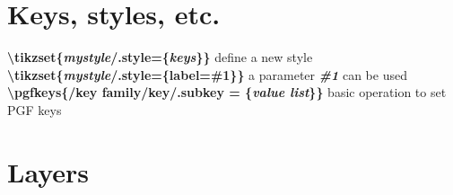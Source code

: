 \documentclass[10pt]{article}
\newcommand{\tikzcmd}[1]{\textbf{#1}}
\newcommand{\tikzparam}[1]{\textbf{\emph{#1}}}
\begin{document}
\begin{multicols}{2}
        \section{Keys, styles, etc.}
        \tikzcmd{\textbackslash tikzset\{\tikzparam{mystyle}/.style=\{\tikzparam{keys}\}\}} define a new style\\
        \tikzcmd{\textbackslash tikzset\{\tikzparam{mystyle}/.style=\{label=\#1\}\}} a parameter \tikzparam{\#1} can be used\\


        \tikzcmd{\textbackslash pgfkeys\{/key family/key/.subkey = \{\tikzparam{value list}\}\}} basic operation to set PGF keys

        \section{Layers}

    \end{multicols}
\end{document}
